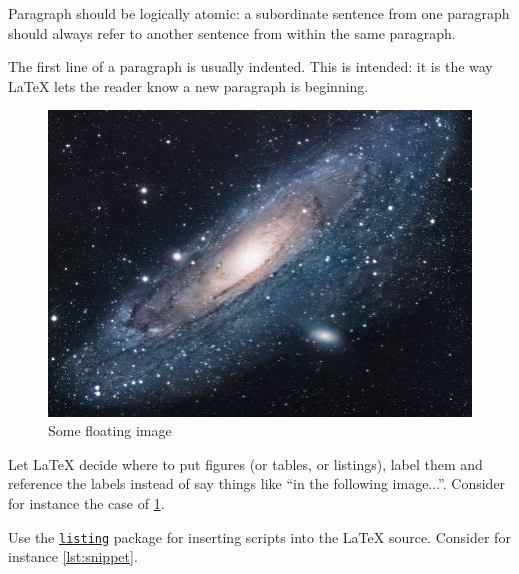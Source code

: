\documentclass{scrartcl}
\begin{document}
Paragraph should be logically atomic: a subordinate sentence from one paragraph should always refer to another sentence from within the same paragraph.

The first line of a paragraph is usually indented.
%
This is intended: it is the way \LaTeX{} lets the reader know a new paragraph is beginning.

\begin{figure} %
    \centering
    \includegraphics[width=0.5\linewidth]{figures/universe.jpg}
    \caption{Some floating image}
    \label{fig:image} 
\end{figure}

Let \LaTeX{} decide where to put figures (or tables, or listings), label them and reference the labels instead of say things like ``in the following image...''.
%
Consider for instance the case of \cref{fig:image}.

Use the \href{https://en.wikibooks.org/wiki/LaTeX/Source_Code_Listings}{\texttt{listing}} package for inserting scripts into the \LaTeX{} source.
%
Consider for instance \cref{lst:snippet}.


\nocite{*} %


\end{document}
